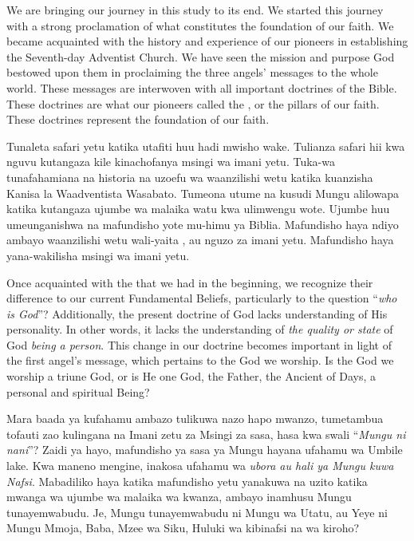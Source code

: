 



We are bringing our journey in this study to its end. We started this journey with a strong proclamation of what constitutes the foundation of our faith. We became acquainted with the history and experience of our pioneers in establishing the Seventh-day Adventist Church. We have seen the mission and purpose God bestowed upon them in proclaiming the three angels’ messages to the whole world. These messages are interwoven with all important doctrines of the Bible. These doctrines are what our pioneers called the , or the pillars of our faith. These doctrines represent the foundation of our faith.


Tunaleta safari yetu katika utafiti huu hadi mwisho wake. Tulianza safari hii kwa nguvu kutangaza kile kinachofanya msingi wa imani yetu. Tuka-wa tunafahamiana na historia na uzoefu wa waanzilishi wetu katika kuanzisha Kanisa la Waadventista Wasabato. Tumeona utume na kusudi Mungu alilowapa katika kutangaza ujumbe wa malaika watu kwa ulimwengu wote. Ujumbe huu umeunganishwa na mafundisho yote mu-himu ya Biblia. Mafundisho haya ndiyo ambayo waanzilishi wetu wali-yaita , au nguzo za imani yetu. Mafundisho haya yana-wakilisha msingi wa imani yetu.


Once acquainted with the  that we had in the beginning, we recognize their difference to our current Fundamental Beliefs, particularly to the question “\textit{who is God}”? Additionally, the present doctrine of God lacks understanding of His personality. In other words, it lacks the understanding of \textit{the quality or state} of God \textit{being a person}. This change in our doctrine becomes important in light of the first angel’s message, which pertains to the God we worship. Is the God we worship a triune God, or is He one God, the Father, the Ancient of Days, a personal and spiritual Being?


Mara baada ya kufahamu  ambazo tulikuwa nazo hapo mwanzo, tumetambua tofauti zao kulingana na Imani zetu za Msingi za sasa, hasa kwa swali “\textit{Mungu ni nani}”? Zaidi ya hayo, mafundisho ya sasa ya Mungu hayana ufahamu wa Umbile lake. Kwa maneno mengine, inakosa ufahamu wa \textit{ubora au hali ya Mungu kuwa Nafsi}. Mabadiliko haya katika mafundisho yetu yanakuwa na uzito katika mwanga wa ujumbe wa malaika wa kwanza, ambayo inamhusu Mungu tunayemwabudu. Je, Mungu tunayemwabudu ni Mungu wa Utatu, au Yeye ni Mungu Mmoja, Baba, Mzee wa Siku, Huluki wa kibinafsi na wa kiroho?


